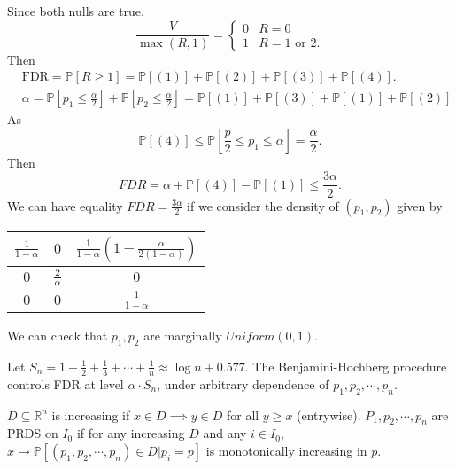 \documentclass[a4paper]{article}
\begin{document}
\begin{eg}
	\noindent Since both nulls are true.
	\begin{equation*}
		\frac{V}{\max(R,1)} = \left\{ 
		\begin{array}{ll}
			0 & R = 0 \\
			1 & R = 1 \text{ or } 2.
		\end{array}
		\right.
	\end{equation*}
	Then
	\begin{equation*}
		\begin{aligned}
			& \text{FDR} = \mathbb{P}[R \geq 1] = \mathbb{P}[(1)] + \mathbb{P}[(2)] + \mathbb{P}[(3)] + \mathbb{P}[(4)]. \\
			& \alpha = \mathbb{P}\left[p_1 \leq \frac{\alpha}{2}\right] + \mathbb{P}\left[p_2 \leq \frac{\alpha}{2}\right] = \mathbb{P}[(1)] + \mathbb{P}[(3)] + \mathbb{P}[(1)] + \mathbb{P}[(2)]
		\end{aligned}
	\end{equation*}
	As
	\begin{equation*}
		\mathbb{P}[(4)] \leq \mathbb{P}[\frac{p}{2} \leq p_1 \leq \alpha] = \frac{\alpha}{2}.
	\end{equation*}
	Then
	\begin{equation}
		FDR = \alpha + \mathbb{P}[(4)] - \mathbb{P}[(1)] \leq \frac{3\alpha}{2}.
	\end{equation}
	We can have equality $FDR = \frac{3\alpha}{2}$ if we consider the density of $(p_1,p_2)$ given by
	\begin{center}
		\begin{tabular}{| c | c | c |}
			\hline
			$\frac{1}{1-\alpha}$ & $0$ & $\frac{1}{1-\alpha}(1-\frac{\alpha}{2(1-\alpha)})$ \\
			\hline
			$0$ & $\frac{2}{\alpha}$ & $0$ \\
			\hline
			$0$ & $0$ & $\frac{1}{1-\alpha}$ \\
			\hline
		\end{tabular}
	\end{center}
	We can check that $p_1,p_2$ are marginally $Uniform(0,1)$.
\end{eg}

\begin{thm}
	Let $S_n = 1 + \frac{1}{2} + \frac{1}{3} + \cdots + \frac{1}{n} \approx \log n + 0.577$. The Benjamini-Hochberg procedure controls FDR at level $\alpha \cdot S_n$, under arbitrary dependence of $p_1, p_2, \cdots, p_n$.
\end{thm}

\begin{defi}
	$D \subseteq \mathbb{R}^n$ is increasing if $x \in D \implies y \in D$ for all $y \geq x$ (entrywise). $P_1,p_2, \cdots, p_n$ are PRDS on $I_0$ if for any increasing $D$ and any $i \in I_0$, $x \to \mathbb{P}[(p_1,p_2,\cdots,p_n) \in D | p_i = p]$ is monotonically increasing in $p$.
\end{defi}
\end{document}
